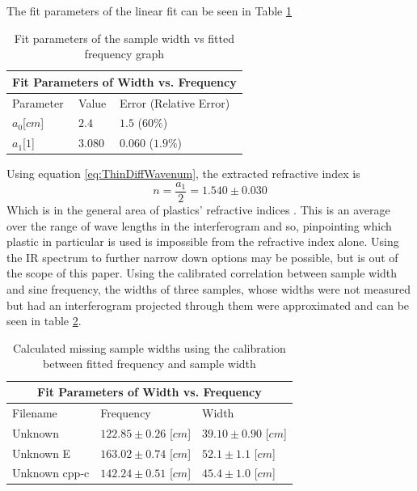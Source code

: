 \documentclass[reprint,amsmath,amssymb,aps, prl]{revtex4-2}
\begin{document}
The fit parameters of the linear fit can be seen in Table \ref{tbl:WidthFit}
\begin{table}[h]
    \begin{tabular}{ |p{2cm}|p{2cm}|p{3.3cm}|  }
     \hline
     \multicolumn{3}{|c|}{Fit Parameters of Width vs. Frequency} \\ \hline
     Parameter & Value & Error (Relative Error)\\ \hline
     $a_{0}$[$cm$]  &$2.4$      &$1.5$ ($60\%$) \\ 
     $a_{1}$[$1$]   &$3.080$    &$0.060$ ($1.9\%$)  \\ \hline
    \end{tabular}
    \caption{\label{tbl:WidthFit}Fit parameters of the sample width vs fitted frequency graph}
\end{table}

Using equation \ref{eq:ThinDiffWavenum}, the extracted refractive index is
\begin{equation}
    n = \frac{a_1}{2} = 1.540 \pm 0.030
\end{equation}
Which is in the general area of plastics' refractive indices \cite{plasticRefract}. This is an average over the range of wave lengths in the interferogram and so, pinpointing which plastic in particular is used is impossible from the refractive index alone. Using the IR spectrum to further narrow down options may be possible, but is out of the scope of this paper.
Using the calibrated correlation between sample width and sine frequency, the widths of three samples, whose widths were not measured but had an interferogram projected through them were approximated and can be seen in table \ref{tbl:ThinMissingWidths}.
\begin{table}[h]
    \begin{tabular}{ |p{2.3cm}|p{3cm}|p{3cm}|  }
     \hline
     \multicolumn{3}{|c|}{Fit Parameters of Width vs. Frequency} \\ \hline
     Filename & Frequency & Width\\ \hline
     Unknown  &$122.85\pm0.26$ [$cm$]      &$39.10\pm0.90$ [$cm$]\\ 
     Unknown E &$163.02\pm0.74$ [$cm$]      &$52.1\pm1.1$ [$cm$]\\ 
     Unknown cpp-c&$142.24\pm0.51$ [$cm$]      &$45.4\pm1.0$ [$cm$]\\ \hline
    \end{tabular}
    \caption{\label{tbl:ThinMissingWidths}Calculated missing sample widths using the calibration between fitted frequency and sample width}
\end{table}
\end{document}
